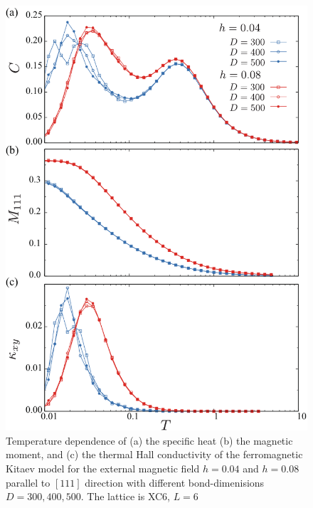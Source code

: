 \documentclass[reprint,amsmath,amssymb,aps,prx]{revtex4-2}
\begin{document}
\begin{figure}
  \begin{center}
    \includegraphics[width=0.9\linewidth]{plot_CMk.pdf}
  \end{center}
  \caption{Temperature dependence of (a) the specific heat (b) the magnetic moment, and (c) the thermal Hall conductivity of the ferromagnetic Kitaev model for the external magnetic field $h=0.04$ and $h=0.08$ parallel to $[111]$ direction with different bond-dimenisions $D=300, 400, 500$. The lattice is XC6, $L=6$}
  \label{fig:CMk_XC6}
\end{figure}
\end{document}
